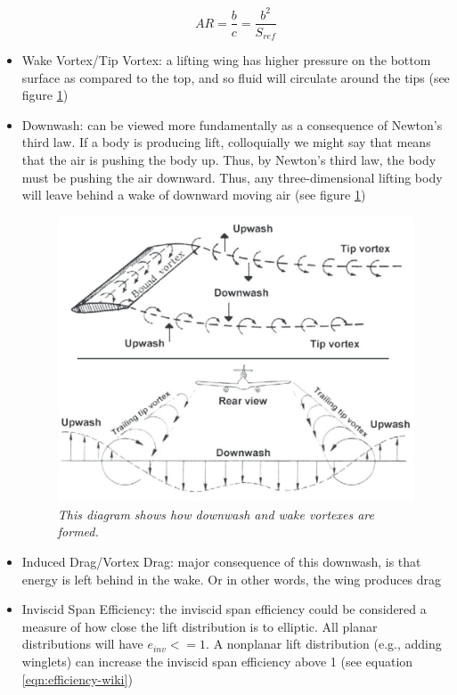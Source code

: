 \documentclass{journal}
\begin{document}
\begin{itemize}
		\begin{equation}
			AR = \frac{b}{c} = \frac{b^2}{S_{ref}}
			\label{eqn:aspect-ratio-wiki}
		\end{equation}
		
		\item Wake Vortex/Tip Vortex: a lifting wing has higher pressure on the bottom surface as compared to the top, and so fluid will circulate around the tips (see figure \ref{fig:downwash-wakevortex})
		\item Downwash: can be viewed more fundamentally as a consequence of Newton’s third law. If a body is producing lift, colloquially we might say that means that the air is pushing the body up. Thus, by Newton’s third law, the body must be pushing the air downward. Thus, any three-dimensional lifting body will leave behind a wake of downward moving air (see figure \ref{fig:downwash-wakevortex})
		
		\begin{figure}
			\centering
			\includegraphics[scale=0.4]{../graphics/downwash-wakevortex.png}
			\caption{\emph{This diagram shows how downwash and wake vortexes are formed.}}
			\label{fig:downwash-wakevortex}
		\end{figure}
		
		\item Induced Drag/Vortex Drag: major consequence of this downwash, is that energy is left behind in the wake. Or in other words, the wing produces drag
		\item Inviscid Span Efficiency:  the inviscid span efficiency could be considered a measure of how close the lift distribution is to elliptic. All planar distributions will have \(e_{inv} <= 1\). A nonplanar lift distribution (e.g., adding winglets) can increase the inviscid span efficiency above 1 (see equation \ref{eqn:efficiency-wiki})
		

\end{itemize}
\end{document}
